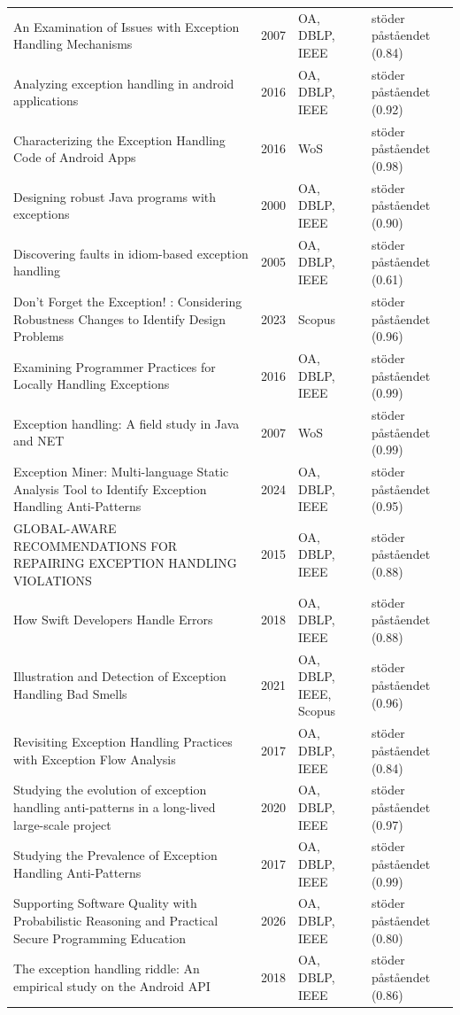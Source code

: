 \begin{longtable}{@{}%
  >{\raggedright\arraybackslash}p{}c%
  >{\raggedright\arraybackslash}p{}%
  >{\raggedright\arraybackslash}p{}@{}}
An Examination of Issues with Exception Handling Mechanisms & 2007 & OA, DBLP, IEEE & stöder påståendet (0.84) \\
Analyzing exception handling in android applications & 2016 & OA, DBLP, IEEE & stöder påståendet (0.92) \\
Characterizing the Exception Handling Code of Android Apps & 2016 & WoS & stöder påståendet (0.98) \\
Designing robust Java programs with exceptions & 2000 & OA, DBLP, IEEE & stöder påståendet (0.90) \\
Discovering faults in idiom-based exception handling & 2005 & OA, DBLP, IEEE & stöder påståendet (0.61) \\
Don't Forget the Exception! : Considering Robustness Changes to Identify Design Problems & 2023 & Scopus & stöder påståendet (0.96) \\
Examining Programmer Practices for Locally Handling Exceptions & 2016 & OA, DBLP, IEEE & stöder påståendet (0.99) \\
Exception handling: A field study in Java and NET & 2007 & WoS & stöder påståendet (0.99) \\
Exception Miner: Multi-language Static Analysis Tool to Identify Exception Handling Anti-Patterns & 2024 & OA, DBLP, IEEE & stöder påståendet (0.95) \\
GLOBAL-AWARE RECOMMENDATIONS FOR REPAIRING EXCEPTION HANDLING VIOLATIONS & 2015 & OA, DBLP, IEEE & stöder påståendet (0.88) \\
How Swift Developers Handle Errors & 2018 & OA, DBLP, IEEE & stöder påståendet (0.88) \\
Illustration and Detection of Exception Handling Bad Smells & 2021 & OA, DBLP, IEEE, Scopus & stöder påståendet (0.96) \\
Revisiting Exception Handling Practices with Exception Flow Analysis & 2017 & OA, DBLP, IEEE & stöder påståendet (0.84) \\
Studying the evolution of exception handling anti-patterns in a long-lived large-scale project & 2020 & OA, DBLP, IEEE & stöder påståendet (0.97) \\
Studying the Prevalence of Exception Handling Anti-Patterns & 2017 & OA, DBLP, IEEE & stöder påståendet (0.99) \\
Supporting Software Quality with Probabilistic Reasoning and Practical Secure Programming Education & 2026 & OA, DBLP, IEEE & stöder påståendet (0.80) \\
The exception handling riddle: An empirical study on the Android API & 2018 & OA, DBLP, IEEE & stöder påståendet (0.86) \\

\end{longtable}
